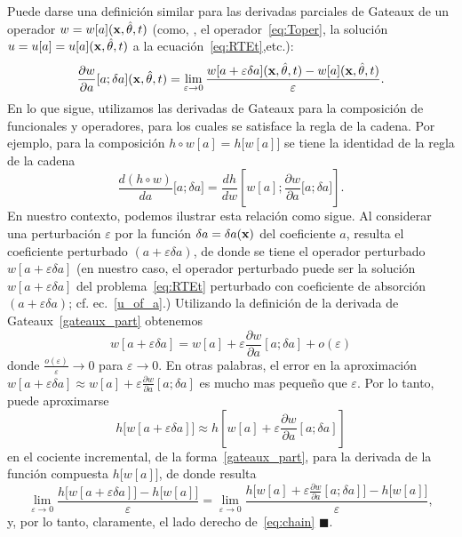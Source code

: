 Puede darse una definición similar para las derivadas parciales de Gateaux 
de un operador $w = w[a](\mathbf{x},\hat{\theta},t)$ (como, \eg, el operador~\eqref{eq:Toper}, 
la solución $u = u[a]=u[a](\mathbf{x},\hat{\theta},t)$ a la ecuación~\eqref{eq:RTEt},etc.):
\begin{equation}\label{gateaux_part}
  \frac{\partial w}{\partial a}[a; \delta a ](\mathbf{x},\hat{\theta},t) = \lim_{\varepsilon \to 0} \frac{w[a +\varepsilon \delta a](\mathbf{x},\hat{\theta},t)
    - w[a](\mathbf{x},\hat{\theta},t)}{\varepsilon}.
\end{equation}
En lo que sigue, utilizamos las derivadas de Gateaux para la composición 
de funcionales y operadores, para los cuales se satisface la regla de la cadena. 
Por ejemplo, para la composición  $h\circ w [a] = h\big[w[a]\big]$ 
se tiene la identidad de la regla de la cadena
\begin{equation}\label{eq:chain}
  \frac{d (h\circ w)}{da} \big[a;\delta a\big]= \frac{d h}{
    d w}\left[w[a];\frac{\partial w}{\partial a} \big[a;\delta
    a\big]\right].
\end{equation}
En nuestro contexto, podemos ilustrar esta relación como sigue. 
Al considerar una perturbación $\varepsilon$ por la función $\delta a = \delta a(\mathbf{x})$ 
del coeficiente $a$, resulta el coeficiente perturbado $(a+\varepsilon\delta a)$, 
de donde se tiene el operador perturbado $w[a+\varepsilon\delta a]$ (en nuestro caso, 
el operador perturbado puede ser \eg la solución $w[a+\varepsilon\delta a]$ del problema~\eqref{eq:RTEt} perturbado con coeficiente de absorción $(a+\varepsilon\delta a)$; 
cf. ec.~\eqref{u_of_a}.) Utilizando la definición de la derivada 
de Gateaux~\eqref{gateaux_part} obtenemos
\[
  w[a+\varepsilon\delta a] = w[a]+\varepsilon \frac{\partial
    w}{\partial a}[a; \delta a ] + o(\varepsilon)
\]
donde $\frac{o(\varepsilon)}{\varepsilon}\to 0$ para $\varepsilon\to 0$. 
En otras palabras, el error en la aproximación $w[a+\varepsilon\delta a] \approx w[a]+\varepsilon \frac{\partial
  w}{\partial a}[a; \delta a ]$ es mucho mas pequeño que $\varepsilon$. 
Por lo tanto, puede aproximarse   
\[
  h\big[w[a+\varepsilon\delta a]\big] \approx h\left[w[a]+\varepsilon \frac{\partial
    w}{\partial a}[a; \delta a ]\right]
\]
en el cociente incremental, de la forma~\eqref{gateaux_part}, 
para la derivada de la función compuesta $h\big[w[a]\big]$, 
de donde resulta 
\[
 \lim_{\varepsilon\to 0}\frac{h\big[w[a+\varepsilon\delta a]\big]
     -h\big[w[a]\big]}{\varepsilon}  = \lim_{\varepsilon\to
    0} \frac{h\big[w[a]+\varepsilon \frac{\partial w}{\partial a}[a;
    \delta a ]\big]-h\big[w[a]\big]}{\varepsilon},
\]
y, por lo tanto, claramente, el lado derecho de~\eqref{eq:chain} $\blacksquare$.

